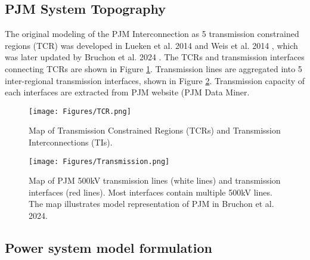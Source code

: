 \documentclass[9pt,twoside,lineno]{pnas-new}
\begin{document}
\subsection{PJM System Topography}

The original modeling of the PJM Interconnection as 5 transmission constrained regions (TCR) was developed in Lueken et al. 2014 and Weis et al. 2014 \cite{lueken_effects_2014,weis_estimating_2014}, which was later updated by Bruchon et al. 2024 \cite{bruchon_cleaning_2024}. The TCRs and transmission interfaces connecting TCRs are shown in Figure \ref{fig:TCR}. Transmission lines are aggregated into 5 inter-regional transmission interfaces, shown in Figure \ref{fig:trans}. Transmission capacity of each interfaces are extracted from PJM website (PJM Data Miner. 

\begin{figure}[!ht]
    \centering
    \texttt{[image: Figures/TCR.png]}
    \caption{Map of Transmission Constrained Regions (TCRs) and Transmission Interconnections (TIs).}
    \label{fig:TCR}
\end{figure}

\begin{figure}[!ht]
    \centering
    \texttt{[image: Figures/Transmission.png]}
    \caption{Map of PJM 500kV transmission lines (white lines) and transmission interfaces (red lines).  Most interfaces contain multiple 500kV lines. The map illustrates model representation of PJM in Bruchon et al. 2024.}
    \label{fig:trans}
\end{figure}

\subsection{Power system model formulation}
\end{document}
